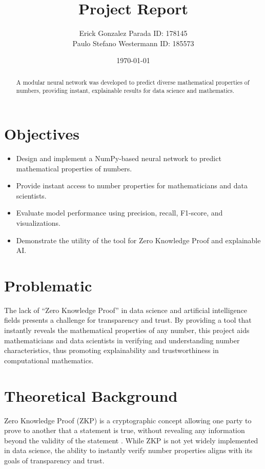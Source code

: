 \documentclass[twoside]{article}
\begin{document}

\title{Project Report}
\author{\small{Erick Gonzalez Parada ID: 178145}\\
\small{Paulo Stefano Westermann ID: 185573}}
\date{\today}
\maketitle

\begin{abstract}
A modular neural network was developed to predict diverse mathematical properties of numbers, providing instant, explainable results for data science and mathematics. 
\end{abstract}


\begin{multicols}{2}

\section{Objectives}
\begin{itemize}
    \item Design and implement a NumPy-based neural network to predict mathematical properties of numbers.
    \item Provide instant access to number properties for mathematicians and data scientists.
    \item Evaluate model performance using precision, recall, F1-score, and visualizations.
    \item Demonstrate the utility of the tool for Zero Knowledge Proof and explainable AI.
\end{itemize}

\section{Problematic}
The lack of ``Zero Knowledge Proof'' in data science and artificial intelligence fields presents a challenge for transparency and trust. By providing a tool that instantly reveals the mathematical properties of any number, this project aids mathematicians and data scientists in verifying and understanding number characteristics, thus promoting explainability and trustworthiness in computational mathematics.

\section{Theoretical Background}
Zero Knowledge Proof (ZKP) is a cryptographic concept allowing one party to prove to another that a statement is true, without revealing any information beyond the validity of the statement \cite{zeroknowledgeproof}. While ZKP is not yet widely implemented in data science, the ability to instantly verify number properties aligns with its goals of transparency and trust.


\end{multicols}
\end{document}
